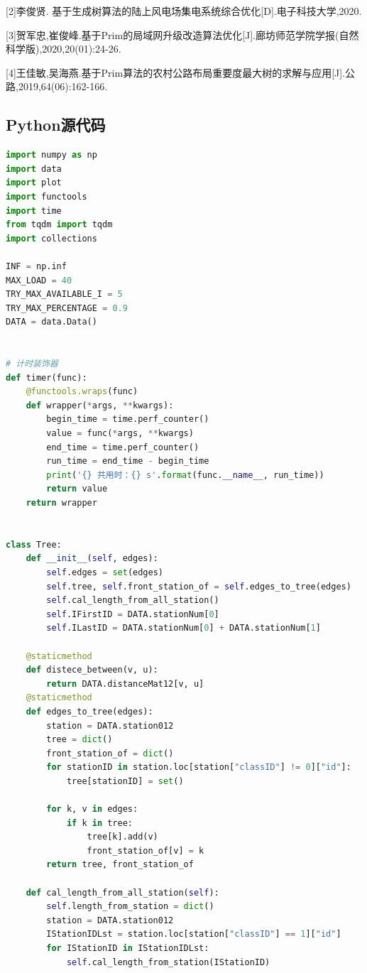 \documentclass{cumcmthesis}
\begin{document}
  [2]李俊贤. 基于生成树算法的陆上风电场集电系统综合优化[D].电子科技大学,2020.
  
  [3]贺军忠,崔俊峰.基于Prim的局域网升级改造算法优化[J].廊坊师范学院学报(自然科学版),2020,20(01):24-26.
  
  [4]王佳敏,吴海燕.基于Prim算法的农村公路布局重要度最大树的求解与应用[J].公路,2019,64(06):162-166.
  

\newpage
\begin{appendices}
  \section{Python源代码}
  \begin{lstlisting}[language=python]
import numpy as np
import data
import plot
import functools
import time
from tqdm import tqdm
import collections

INF = np.inf
MAX_LOAD = 40
TRY_MAX_AVAILABLE_I = 5
TRY_MAX_PERCENTAGE = 0.9
DATA = data.Data()


# 计时装饰器
def timer(func):
    @functools.wraps(func)
    def wrapper(*args, **kwargs):
        begin_time = time.perf_counter()
        value = func(*args, **kwargs)
        end_time = time.perf_counter()
        run_time = end_time - begin_time
        print('{} 共用时：{} s'.format(func.__name__, run_time))
        return value
    return wrapper


class Tree:
    def __init__(self, edges):
        self.edges = set(edges)
        self.tree, self.front_station_of = self.edges_to_tree(edges)
        self.cal_length_from_all_station()
        self.IFirstID = DATA.stationNum[0]
        self.ILastID = DATA.stationNum[0] + DATA.stationNum[1]

    @staticmethod
    def distece_between(v, u):
        return DATA.distanceMat12[v, u]
    @staticmethod
    def edges_to_tree(edges):
        station = DATA.station012
        tree = dict()
        front_station_of = dict()
        for stationID in station.loc[station["classID"] != 0]["id"]:
            tree[stationID] = set()

        for k, v in edges:
            if k in tree:
                tree[k].add(v)
                front_station_of[v] = k
        return tree, front_station_of

    def cal_length_from_all_station(self):
        self.length_from_station = dict()
        station = DATA.station012
        IStationIDLst = station.loc[station["classID"] == 1]["id"]
        for IStationID in IStationIDLst:
            self.cal_length_from_station(IStationID)


\end{lstlisting}
\end{appendices}
\end{document}
